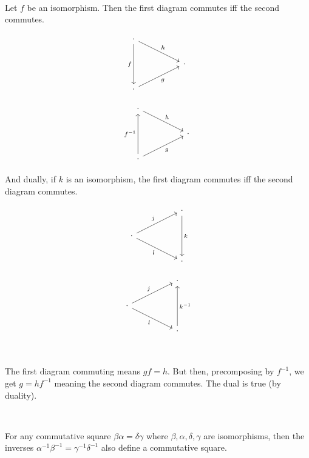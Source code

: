 \documentclass{article}
\begin{document}
\begin{lemma}
\

Let $f$ be an isomorphism. Then the first diagram commutes iff the second commutes.

\[\begin{tikzcd} \cdot & & \\
& & \cdot \\
\cdot & &
\arrow[from=1-1, to=3-1, "f"']
\arrow[from=1-1,to=2-3, "h"]
\arrow[from=3-1, to=2-3, "g"']
\end{tikzcd}\]

\[\begin{tikzcd} \cdot & & \\
& & \cdot \\
\cdot & &
\arrow[from=3-1, to=1-1, "f ^{-1}"]
\arrow[from=1-1,to=2-3, "h"]
\arrow[from=3-1, to=2-3, "g"']
\end{tikzcd}\]

And dually, if $k$ is an isomorphism, the first diagram commutes iff the second diagram commutes.

\[\begin{tikzcd}
    & & \cdot\\
    \cdot & & \\
    & & \cdot
    \arrow[from=2-1, to=1-3, "j"]
    \arrow[from=2-1, to=3-3, "l"']
    \arrow[from=1-3, to=3-3, "k"]
\end{tikzcd}\]

\[\begin{tikzcd}
    & & \cdot\\
    \cdot & & \\
    & & \cdot
    \arrow[from=2-1, to=1-3, "j"]
    \arrow[from=2-1, to=3-3, "l"']
    \arrow[from=3-3, to=1-3, "k ^{-1}"']
\end{tikzcd}\]
\end{lemma}

\begin{customproof}
\

The first diagram commuting means $gf = h$. But then, precomposing by $f ^{-1}$, we get $g = hf ^{-1}$ meaning the second diagram commutes. The dual is true (by duality).
\end{customproof}

\begin{lemma}
\

For any commutative square $\beta\alpha= \delta\gamma$ where $\beta, \alpha, \delta, \gamma$ are isomorphisms, then the inverses $\alpha ^{-1} \beta ^{-1} = \gamma ^{-1}\delta ^{-1}$ also define a commutative square.
\end{lemma}
\end{document}
